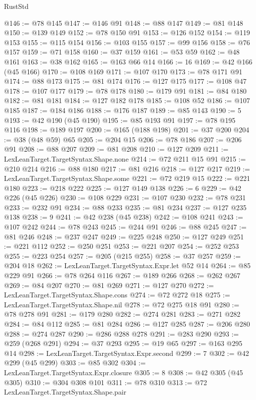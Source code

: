 \begin{lexlean}{RustStd}
\begin{coremodule}
@146 := @78 @145
@147 := @146 @91
@148 := @88 @147
@149 := @81 @148
@150 := @139 @149
@152 := @78 @150 @91
@153 := @126 @152
@154 := @119 @153
@155 := @115 @154
@156 := @103 @155
@157 := @99 @156
@158 := @76 @157
@159 := @71 @158
@160 := @37 @159
@161 := @53 @59
@162 := @48 @161
@163 := @38 @162
@165 := @163 @66 @14
@166 := 16
@169 := @42 @166 (@45 @166)
@170 := @108 @169
@171 := @107 @170
@173 := @78 @171 @91
@174 := @88 @173
@175 := @81 @174
@176 := @127 @175
@177 := @108 @47
@178 := @107 @177
@179 := @78 @178
@180 := @179 @91
@181 := @84 @180
@182 := @81 @181
@184 := @127 @182 @178
@185 := @108 @52
@186 := @107 @185
@187 := @184 @186
@188 := @176 @187
@189 := @85 @143
@190 := 5
@193 := @42 @190 (@45 @190)
@195 := @85 @193 @91
@197 := @78 @195 @116
@198 := @189 @197
@200 := @165 (@188 @198)
@201 := @37 @200
@204 := @38 (@48 @59) @65
@205 := @204 @15
@206 := @78 @186
@207 := @206 @91
@208 := @88 @207
@209 := @81 @208
@210 := @127 @209
@211 := LexLeanTarget.TargetSyntax.Shape.none
@214 := @72 @211 @15 @91
@215 := @210 @214
@216 := @88 @180
@217 := @81 @216
@218 := @127 @217
@219 := LexLeanTarget.TargetSyntax.Shape.some
@221 := @72 @219 @15
@222 := @221 @180
@223 := @218 @222
@225 := @127 @149 @138
@226 := 6
@229 := @42 @226 (@45 @226)
@230 := @108 @229
@231 := @107 @230
@232 := @78 @231
@233 := @232 @91
@234 := @88 @233
@235 := @81 @234
@237 := @127 @235 @138
@238 := 9
@241 := @42 @238 (@45 @238)
@242 := @108 @241
@243 := @107 @242
@244 := @78 @243
@245 := @244 @91
@246 := @88 @245
@247 := @81 @246
@248 := @237 @247
@249 := @225 @248
@250 := @127 @249
@251 := @221 @112
@252 := @250 @251
@253 := @221 @207
@254 := @252 @253
@255 := @223 @254
@257 := @205 (@215 @255)
@258 := @37 @257
@259 := @204 @18
@262 := LexLeanTarget.TargetSyntax.Expr.let @52 @14
@264 := @85 @229 @91
@266 := @78 @264 @116
@267 := @189 @266
@268 := @262 @267
@269 := @84 @207
@270 := @81 @269
@271 := @127 @270
@272 := LexLeanTarget.TargetSyntax.Shape.cons
@274 := @72 @272 @18
@275 := LexLeanTarget.TargetSyntax.Shape.nil
@278 := @72 @275 @18 @91
@280 := @78 @278 @91
@281 := @179 @280
@282 := @274 @281
@283 := @271 @282
@284 := @84 @112
@285 := @81 @284
@286 := @127 @285
@287 := @206 @280
@288 := @274 @287
@290 := @286 @288 @278
@291 := @283 @290
@293 := @259 (@268 @291)
@294 := @37 @293
@295 := @19 @65
@297 := @163 @295 @14
@298 := LexLeanTarget.TargetSyntax.Expr.second
@299 := 7
@302 := @42 @299 (@45 @299)
@303 := @85 @302
@304 := LexLeanTarget.TargetSyntax.Expr.closure
@305 := 8
@308 := @42 @305 (@45 @305)
@310 := @304 @308 @101
@311 := @78 @310
@313 := @72 LexLeanTarget.TargetSyntax.Shape.pair

\end{coremodule}
\end{lexlean}
